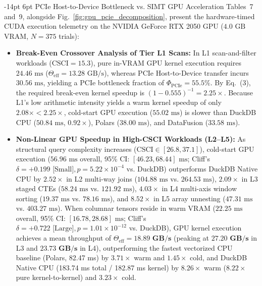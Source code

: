 \documentclass[10pt,a4paper]{article}
\makeatletter
\renewcommand\subsection{\@startsection{subsection}{2}{\z@}%
  {-14pt \@plus -3pt \@minus -1.5pt}%
  {6pt \@plus 1.5pt}%
  {\normalfont\normalsize\bfseries}}
\makeatother
\begin{document}
\subsection{PCIe Host-to-Device Bottleneck vs. SIMT GPU Acceleration}
Tables~7 and~9, alongside Fig.~\ref{fig:gpu_pcie_decomposition}, present the hardware-timed CUDA execution telemetry on the NVIDIA GeForce RTX 2050 GPU ($4.0\text{ GB}$ VRAM, $N=375$ trials):
\begin{itemize}[leftmargin=1.5em,itemsep=2pt]
    \item \textbf{Break-Even Crossover Analysis of Tier L1 Scans:} In L1 scan-and-filter workloads ($\text{CSCI}=15.3$), pure in-VRAM GPU kernel execution requires $24.46\text{ ms}$ ($\Theta_{\text{eff}} = 13.28\text{ GB/s}$), whereas PCIe Host-to-Device transfer incurs $30.56\text{ ms}$, yielding a PCIe bottleneck fraction of $\Phi_{\text{PCIe}} = 55.5\%$. By Eq.~(3), the required break-even kernel speedup is $(1 - 0.555)^{-1} = \mathbf{2.25\times}$. Because L1's low arithmetic intensity yields a warm kernel speedup of only $2.08\times < 2.25\times$, cold-start GPU execution ($55.02\text{ ms}$) is slower than DuckDB CPU ($50.84\text{ ms}$, $0.92\times$), Polars ($38.00\text{ ms}$), and DataFusion ($33.58\text{ ms}$).
    \item \textbf{Non-Linear GPU Speedup in High-CSCI Workloads (L2--L5):} As structural query complexity increases ($\text{CSCI} \in [26.8, 37.1]$), cold-start GPU execution ($56.96\text{ ms}$ overall, 95\% CI: $[46.23, 68.44]\text{ ms}$; Cliff's $\delta = +0.199\text{ [Small]}, p = 5.22 \times 10^{-4}$ vs. DuckDB) outperforms DuckDB Native CPU by $\mathbf{2.52\times}$ in L2 multi-way joins ($104.88\text{ ms}$ vs. $264.53\text{ ms}$), $\mathbf{2.09\times}$ in L3 staged CTEs ($58.24\text{ ms}$ vs. $121.92\text{ ms}$), $\mathbf{4.03\times}$ in L4 multi-axis window sorting ($19.37\text{ ms}$ vs. $78.16\text{ ms}$), and $\mathbf{8.52\times}$ in L5 array unnesting ($47.31\text{ ms}$ vs. $403.27\text{ ms}$). When columnar tensors reside in warm VRAM ($22.25\text{ ms}$ overall, 95\% CI: $[16.78, 28.68]\text{ ms}$; Cliff's $\delta = +0.722\text{ [Large]}, p = 1.01 \times 10^{-12}$ vs. DuckDB), GPU kernel execution achieves a mean throughput of $\Theta_{\text{eff}} = \mathbf{18.89\text{ GB/s}}$ (peaking at $\mathbf{27.20\text{ GB/s}}$ in L3 and $\mathbf{23.73\text{ GB/s}}$ in L4), outperforming the fastest vectorized CPU baseline (Polars, 82.47 ms) by $3.71\times$ warm and $1.45\times$ cold, and DuckDB Native CPU (183.74 ms total / 182.87 ms kernel) by $8.26\times$ warm ($8.22\times$ pure kernel-to-kernel) and $3.23\times$ cold.
\end{itemize}
\end{document}
